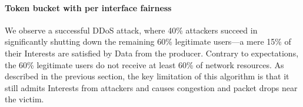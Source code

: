 \documentclass[10pt,conference]{IEEEtran}
\renewcommand{\texttt}[1]{{\nicettfont #1}}
\begin{document}
{%
%
%
%

\paragraph{\textbf{Token bucket with per interface fairness}}

We observe a successful DDoS attack, where 40\% attackers succeed in significantly shutting down the remaining 60\% legitimate users---a mere 15\% of their Interests are satisfied by Data from the producer. Contrary to expectations, the 60\% legitimate users do not receive at least 60\% of network resources. As described in the previous section, the key limitation of this algorithm is that it still admits Interests from attackers and causes congestion and packet drops near the victim. %

}
\end{document}
